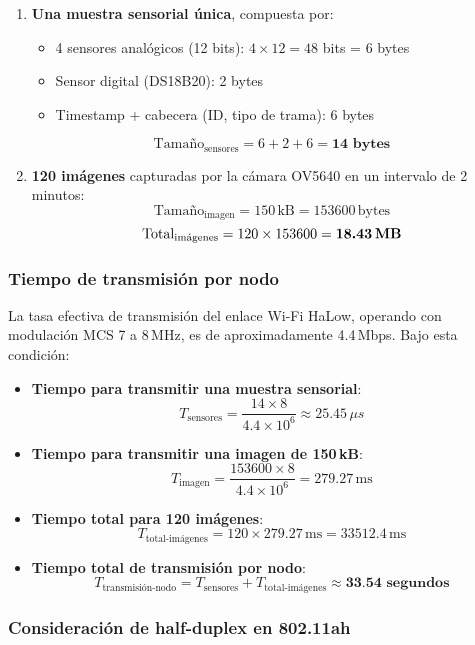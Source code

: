 \begin{enumerate}
    \item \textbf{Una muestra sensorial única}, compuesta por:
    \begin{itemize}
        \item 4 sensores analógicos (12 bits): $4 \times 12 = 48$ bits = 6 bytes
        \item Sensor digital (DS18B20): 2 bytes
        \item Timestamp + cabecera (ID, tipo de trama): 6 bytes
    \end{itemize}
    \[
    \text{Tamaño}_{\text{sensores}} = 6 + 2 + 6 = \textbf{14 bytes}
    \]

    \item \textbf{120 imágenes} capturadas por la cámara OV5640 en un intervalo de 2 minutos:
    \[
    \text{Tamaño}_{\text{imagen}} = 150\,\text{kB} = 153600\,\text{bytes}
    \]
    \[
    \text{Total}_{\text{imágenes}} = 120 \times 153600 = \textbf{18.43\,MB}
    \]
\end{enumerate}

\subsubsection*{Tiempo de transmisión por nodo}
La tasa efectiva de transmisión del enlace Wi-Fi HaLow, operando con modulación MCS 7 a 8\,MHz, es de aproximadamente 4.4\,Mbps. Bajo esta condición:

\begin{itemize}
    \item \textbf{Tiempo para transmitir una muestra sensorial}:
    \[
    T_{\text{sensores}} = \frac{14 \times 8}{4.4 \times 10^6} \approx 25.45\,\mu s
    \]
    \item \textbf{Tiempo para transmitir una imagen de 150\,kB}:
    \[
    T_{\text{imagen}} = \frac{153600 \times 8}{4.4 \times 10^6} = 279.27\,\text{ms}
    \]
    \item \textbf{Tiempo total para 120 imágenes}:
    \[
    T_{\text{total-imágenes}} = 120 \times 279.27\,\text{ms} = 33512.4\,\text{ms}
    \]
    \item \textbf{Tiempo total de transmisión por nodo}:
    \[
    T_{\text{transmisión-nodo}} = T_{\text{sensores}} + T_{\text{total-imágenes}} \approx \textbf{33.54 segundos}
    \]
\end{itemize}

\subsubsection*{Consideración de half-duplex en 802.11ah}

